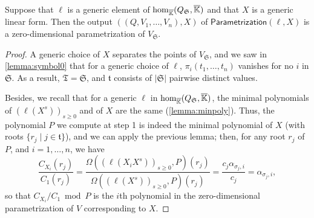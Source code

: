 \documentclass[12pt]{article}
\newcommand{\minpoly}{P}
\newcommand{\lf}{X}
\def\Kbar {{\ensuremath{\overline{\mathbb{K}}}}}
\begin{document}
\begin{lemma}\label{lemma:para2}
  Suppose that $\ell$ is a generic element of ${\rm
    hom}_{\Kbar}(Q_\mathfrak{S},\Kbar)$ and that $\lf$ is a generic
  linear form. Then the output $((Q,V_1,\dots,V_n),\lf)$ of
  $\mathsf{Parametrization}(\ell,\lf)$ is a zero-dimensional
  parametrization of $V_{\mathfrak{S}}$.
\end{lemma}
\begin{proof}
  A generic choice of $\lf$ separates the points of
  $V_{\mathfrak{S}}$, and we saw in \cref{lemma:symbol0} that for a
  generic choice of $\ell$, $\pi_i(t_1,\dots,t_n)$ vanishes for no $i$
  in $\mathfrak{S}$.  As a result, $\mathfrak{T}=\mathfrak{S}$,
  and $\mathfrak{t}$ consists of $|\mathfrak{S}|$ pairwise distinct 
  values.

  Besides, we recall that for a generic $\ell$ in ${\rm
    hom}_{\Kbar}(Q_\mathfrak{S},\Kbar)$, the minimal polynomials of
  $(\ell(\lf^s))_{s \ge 0}$ and of $\lf$ are the same
  (\cref{lemma:minpoly}).  Thus, the polynomial $\minpoly$ we compute
  at step 1 is indeed the minimal polynomial of $\lf$ (with roots
  $\{r_j \mid j \in \mathfrak{t}\}$), and we can apply the previous
  lemma; then, for any root $r_j$ of $\minpoly$, and $i=1,\dots,n$, we
  have
  $$\frac{ C_{X_i}(r_j)}{ C_1(r_j)} = \frac{\Omega((\ell(X_i
    \lf^s))_{s\ge0}, \minpoly)(r_j)}{\Omega((\ell(\lf^s))_{s\ge0} ,\minpoly)(r_j)}=
  \frac{c_j \alpha_{\sigma_j,i}}{c_j} = \alpha_{\sigma_j,i},$$ so that
  $ C_{X_i}/ C_1 \bmod P$ is the $i$th polynomial in the
  zero-dimensional parametrization of $V$ corresponding to $\lf$.
\end{proof}
\end{document}
